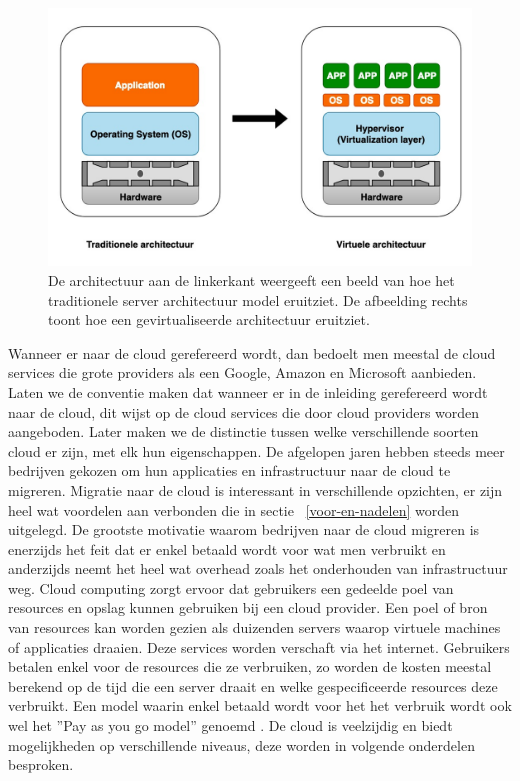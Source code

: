 \newline
\begin{figure}
    \includegraphics[width=1\textwidth]{img/klassiek_virtualisatie}
    \caption{De architectuur aan de linkerkant weergeeft een beeld van hoe het traditionele server architectuur model eruitziet. De afbeelding rechts toont hoe een gevirtualiseerde architectuur eruitziet.} 
    \label{fig:klassiek-vs-virtualisatie}  
\end{figure}
\newline

Wanneer er naar de cloud gerefereerd wordt, dan bedoelt men meestal de cloud services die grote providers als een Google, Amazon en Microsoft aanbieden. Laten we de conventie maken dat wanneer er in de inleiding gerefereerd wordt naar de cloud, dit wijst op de cloud services die door cloud providers worden aangeboden. Later maken we de distinctie tussen welke verschillende soorten cloud er zijn, met elk hun eigenschappen. De afgelopen jaren hebben steeds meer bedrijven gekozen om hun applicaties en infrastructuur naar de cloud te migreren. Migratie naar de cloud is interessant in verschillende opzichten, er zijn heel wat voordelen aan verbonden die in sectie ~\ref{voor-en-nadelen} worden uitgelegd. De grootste motivatie waarom bedrijven naar de cloud migreren is enerzijds het feit dat er enkel betaald wordt voor wat men verbruikt en anderzijds neemt het heel wat overhead zoals het onderhouden van infrastructuur weg. Cloud computing zorgt ervoor dat gebruikers een gedeelde poel van resources en opslag kunnen gebruiken bij een cloud provider. Een poel of bron van resources kan worden gezien als duizenden servers waarop virtuele machines of applicaties draaien. Deze services worden verschaft via het internet. Gebruikers betalen enkel voor de resources die ze verbruiken, zo worden de kosten meestal berekend op de tijd die een server draait en welke gespecificeerde resources deze verbruikt. Een model waarin enkel betaald wordt voor het het verbruik wordt ook wel het ''Pay as you go model'' genoemd . De cloud is veelzijdig en biedt mogelijkheden op verschillende niveaus, deze worden in volgende onderdelen besproken.\autocite{Seghal2018} 


